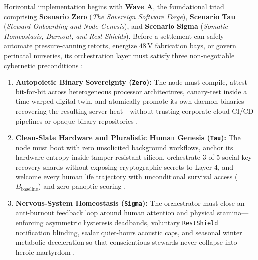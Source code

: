 Horizontal implementation begins with \textbf{Wave A}, the foundational triad comprising \textbf{Scenario Zero}
(\textit{The Sovereign Software Forge}), \textbf{Scenario Tau} (\textit{Steward Onboarding and Node Genesis}), and
\textbf{Scenario Sigma} (\textit{Somatic Homeostasis, Burnout, and Rest Shields}). Before a settlement can safely
automate pressure-canning retorts, energize $48\,\mathrm{V}$ fabrication bays, or govern perinatal nurseries, its
orchestration layer must satisfy three non-negotiable cybernetic preconditions \parencite{beer1972,beer1979,maturana1980}:
\begin{enumerate}
    \item \textbf{Autopoietic Binary Sovereignty (\texttt{Zero}):} The node must compile, attest bit-for-bit across
    heterogeneous processor architectures, canary-test inside a time-warped digital twin, and atomically promote its
    own daemon binaries---recovering the resulting server heat---without trusting corporate cloud CI/CD pipelines or
    opaque binary repositories \parencite{saltzer1984end,grieves2014digital}.
    \item \textbf{Clean-Slate Hardware and Pluralistic Human Genesis (\texttt{Tau}):} The node must boot with zero
    unsolicited background workflows, anchor its hardware entropy inside tamper-resistant silicon, orchestrate 3-of-5
    social key-recovery shards without exposing cryptographic secrets to Layer 4, and welcome every human life
    trajectory with unconditional survival access ($B_{\mathrm{baseline}}$) and zero panoptic scoring
    \parencite{ostrom1990,zuboff2019}.
    \item \textbf{Nervous-System Homeostasis (\texttt{Sigma}):} The orchestrator must close an anti-burnout feedback
    loop around human attention and physical stamina---enforcing asymmetric hysteresis deadbands, voluntary
    \texttt{RestShield} notification blinding, scalar quiet-hours acoustic caps, and seasonal winter metabolic
    deceleration so that conscientious stewards never collapse into heroic martyrdom \parencite{cannon1932,han2015}.
\end{enumerate}

